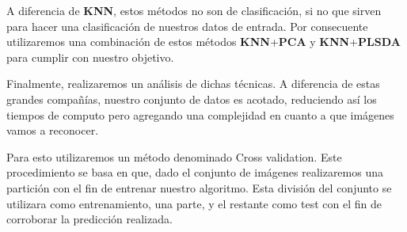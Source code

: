 A diferencia de \textbf{KNN}, estos métodos no son de clasificación, si no que sirven para hacer una clasificación de nuestros datos de entrada. Por consecuente utilizaremos una combinación de estos métodos \textbf{KNN}+\textbf{PCA} y \textbf{KNN}+\textbf{PLSDA} para cumplir con nuestro objetivo.

Finalmente, realizaremos un análisis de dichas técnicas. A diferencia de estas grandes compañías, nuestro conjunto de datos es acotado, reduciendo así los tiempos de computo pero agregando una complejidad en cuanto a que imágenes vamos a reconocer. 

Para esto utilizaremos un método denominado Cross validation. Este procedimiento se basa en que, dado el conjunto de imágenes realizaremos una partición con el fin de entrenar nuestro algoritmo. Esta división del conjunto se utilizara como entrenamiento, una parte, y el restante como test con el fin de corroborar la predicción realizada.

